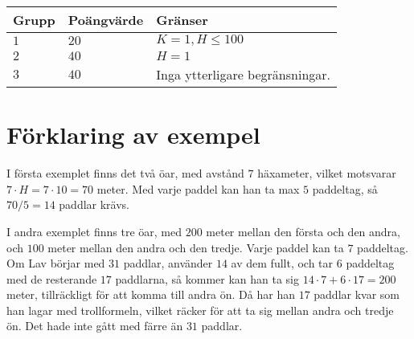 \noindent
\begin{tabular}{| l | l | l |}
  \hline
  \textbf{Grupp} & \textbf{Poängvärde} & \textbf{Gränser} \\ \hline
  $1$    & $20$        &  $ K = 1, H \leq 100 $ \\ \hline 
  $2$    & $40$        &  $ H = 1 $ \\ \hline
  $3$    & $40$        &  Inga ytterligare begränsningar. \\ \hline
\end{tabular}

\section*{Förklaring av exempel}

I första exemplet finns det två öar, med avstånd $7$ häxameter, vilket motsvarar
$7\cdot H = 7\cdot 10=70$ meter. Med varje paddel kan han ta max $5$ paddeltag, så $70/5 = 14$ paddlar krävs.

I andra exemplet finns tre öar, med $200$ meter mellan den första och den andra, och $100$ meter mellan
den andra och den tredje. Varje paddel kan ta $7$ paddeltag. Om Lav börjar med $31$ paddlar, använder
$14$ av dem fullt, och tar $6$ paddeltag med de resterande $17$ paddlarna, så kommer kan han ta sig
$14\cdot 7+6\cdot 17=200$ meter, tillräckligt för att komma till andra ön. Då har han $17$ paddlar
kvar som han lagar med trollformeln, vilket räcker för att ta sig mellan andra och tredje ön.
Det hade inte gått med färre än $31$ paddlar.
